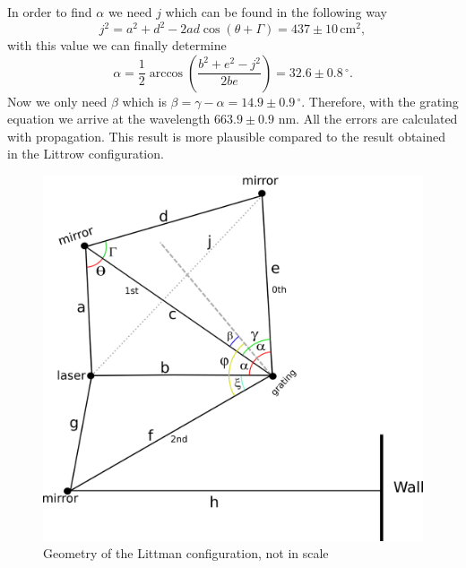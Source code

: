 \documentclass[a4paper,10pt]{article}
\begin{document}
In order to find $\alpha$ we need $j$ which can be found in the following way
\[j^2 = a^2 + d^2 - 2ad\cos(\theta+\Gamma) = 437\pm 10 \, \text{cm}^2,\]
with this value we can finally determine
\[\alpha = \frac{1}{2}\arccos\left(\frac{b^2+e^2-j^2}{2be}\right) = 32.6\pm 0.8\,^\circ.\]
Now we only need $\beta$ which is $\beta = \gamma -\alpha = 14.9\pm 0.9\,^\circ $. Therefore, with the grating equation we arrive at the wavelength $663.9\pm 0.9$ nm. All the errors are calculated with propagation. This result is more plausible compared to the result obtained in the Littrow configuration.

\begin{figure}[H]
\centering
\includegraphics[width=.7\textwidth]{geometry.png}
\caption{Geometry of the Littman configuration, not in scale}\label{geometry}
\end{figure}
\end{document}
